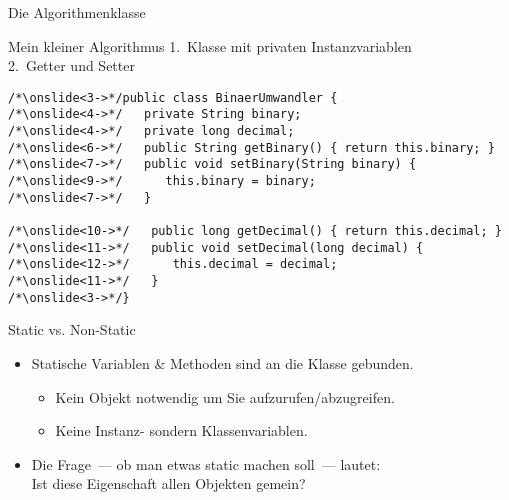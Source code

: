 {
\begin{frame}[c]{Die Algorithmenklasse}
%
\end{frame}
\SidebarReset
\SidebarSolution
\begin{frame}[fragile,c]{Mein kleiner Algorithmus}
 {1.~Klasse  mit privaten Instanzvariablen}\smallskip\\
 {2.~Getter und Setter}\medskip
\begin{verbatim}
/*\onslide<3->*/public class BinaerUmwandler {
/*\onslide<4->*/   private String binary;
/*\onslide<4->*/   private long decimal;
/*\onslide<6->*/   public String getBinary() { return this.binary; }
/*\onslide<7->*/   public void setBinary(String binary) {
/*\onslide<9->*/      this.binary = binary;
/*\onslide<7->*/   }

/*\onslide<10->*/   public long getDecimal() { return this.decimal; }
/*\onslide<11->*/   public void setDecimal(long decimal) {
/*\onslide<12->*/      this.decimal = decimal;
/*\onslide<11->*/   }
/*\onslide<3->*/}
\end{verbatim}
\end{frame}
\SidebarReset




\begin{frame}[c]{Static vs. Non-Static}
   \begin{itemize}[<+(1)->]
      \itemsep11pt
      \item Statische Variablen \& Methoden sind an die Klasse gebunden. \begin{itemize}
         \item Kein Objekt notwendig um Sie aufzurufen/abzugreifen.
         \item Keine Instanz- sondern Klassenvariablen.
      \end{itemize}
      \item Die Frage~--- ob man etwas static machen soll~--- lautet:\\Ist diese Eigenschaft allen Objekten gemein?
   \end{itemize}
\end{frame}


}
